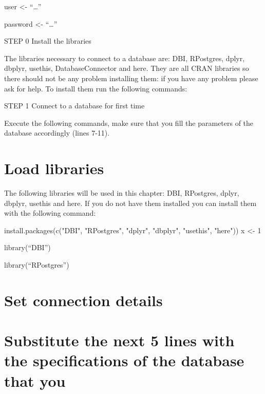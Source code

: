 \documentclass[
  letterpaper,
  DIV=11,
  numbers=noendperiod]{scrreprt}
\newenvironment{Shaded}{\begin{snugshade}}{\end{snugshade}}
\newcommand{\DecValTok}[1]{\textcolor[rgb]{0.68,0.00,0.00}{#1}}
\newcommand{\FunctionTok}[1]{\textcolor[rgb]{0.28,0.35,0.67}{#1}}
\newcommand{\NormalTok}[1]{\textcolor[rgb]{0.00,0.23,0.31}{#1}}
\newcommand{\OtherTok}[1]{\textcolor[rgb]{0.00,0.23,0.31}{#1}}
\newcommand{\StringTok}[1]{\textcolor[rgb]{0.13,0.47,0.30}{#1}}
\begin{document}
user \textless- ``\ldots{}''

password \textless- ``\ldots{}''

STEP 0 Install the libraries

The libraries necessary to connect to a database are: DBI, RPostgres,
dplyr, dbplyr, usethis, DatabaseConnector and here. They are all CRAN
libraries so there should not be any problem installing them: if you
have any problem please ask for help. To install them run the following
commands:

STEP 1 Connect to a database for first time

Execute the following commands, make sure that you fill the parameters
of the database accordingly (lines 7-11).

\hypertarget{load-libraries}{%
\section{Load libraries}\label{load-libraries}}

The following libraries will be used in this chapter: DBI, RPostgres,
dplyr, dbplyr, usethis and here. If you do not have them installed you
can install them with the following command:

\begin{Shaded}
\begin{Highlighting}[]
\FunctionTok{install.packages}\NormalTok{(}\FunctionTok{c}\NormalTok{(}\StringTok{"DBI"}\NormalTok{, }\StringTok{"RPostgres"}\NormalTok{, }\StringTok{"dplyr"}\NormalTok{, }\StringTok{"dbplyr"}\NormalTok{, }\StringTok{"usethis"}\NormalTok{, }\StringTok{"here"}\NormalTok{))}
\NormalTok{x }\OtherTok{\textless{}{-}} \DecValTok{1}
\end{Highlighting}
\end{Shaded}

library(``DBI'')

library(``RPostgres'')

\hypertarget{set-connection-details}{%
\section{Set connection details}\label{set-connection-details}}

\hypertarget{substitute-the-next-5-lines-with-the-specifications-of-the-database-that-you}{%
\section{Substitute the next 5 lines with the specifications of the
database that
you}\label{substitute-the-next-5-lines-with-the-specifications-of-the-database-that-you}}
\end{document}
